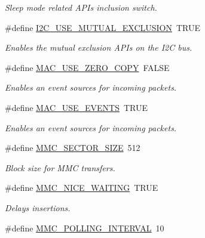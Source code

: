 \begin{DoxyCompactItemize}
\begin{DoxyCompactList}\small\item\em Sleep mode related A\+P\+Is inclusion switch. \end{DoxyCompactList}\item 
\hypertarget{group__HAL__CONF_ga7125642404a6fd3d4985d1cb6e1b7b0a}{}\#define \hyperlink{group__HAL__CONF_ga7125642404a6fd3d4985d1cb6e1b7b0a}{I2\+C\+\_\+\+U\+S\+E\+\_\+\+M\+U\+T\+U\+A\+L\+\_\+\+E\+X\+C\+L\+U\+S\+I\+O\+N}~T\+R\+U\+E\label{group__HAL__CONF_ga7125642404a6fd3d4985d1cb6e1b7b0a}

\begin{DoxyCompactList}\small\item\em Enables the mutual exclusion A\+P\+Is on the I2\+C bus. \end{DoxyCompactList}\item 
\hypertarget{group__HAL__CONF_gad763d9426413cf2fe3922ebb8578bc59}{}\#define \hyperlink{group__HAL__CONF_gad763d9426413cf2fe3922ebb8578bc59}{M\+A\+C\+\_\+\+U\+S\+E\+\_\+\+Z\+E\+R\+O\+\_\+\+C\+O\+P\+Y}~F\+A\+L\+S\+E\label{group__HAL__CONF_gad763d9426413cf2fe3922ebb8578bc59}

\begin{DoxyCompactList}\small\item\em Enables an event sources for incoming packets. \end{DoxyCompactList}\item 
\hypertarget{group__HAL__CONF_ga887da1c1383a9e7b45c4464877a7e05e}{}\#define \hyperlink{group__HAL__CONF_ga887da1c1383a9e7b45c4464877a7e05e}{M\+A\+C\+\_\+\+U\+S\+E\+\_\+\+E\+V\+E\+N\+T\+S}~T\+R\+U\+E\label{group__HAL__CONF_ga887da1c1383a9e7b45c4464877a7e05e}

\begin{DoxyCompactList}\small\item\em Enables an event sources for incoming packets. \end{DoxyCompactList}\item 
\hypertarget{group__HAL__CONF_ga502a0143be4c303f3006c0888e1cec82}{}\#define \hyperlink{group__HAL__CONF_ga502a0143be4c303f3006c0888e1cec82}{M\+M\+C\+\_\+\+S\+E\+C\+T\+O\+R\+\_\+\+S\+I\+Z\+E}~512\label{group__HAL__CONF_ga502a0143be4c303f3006c0888e1cec82}

\begin{DoxyCompactList}\small\item\em Block size for M\+M\+C transfers. \end{DoxyCompactList}\item 
\#define \hyperlink{group__HAL__CONF_ga3087dfffa81dd8a0a80ee92746e65fe2}{M\+M\+C\+\_\+\+N\+I\+C\+E\+\_\+\+W\+A\+I\+T\+I\+N\+G}~T\+R\+U\+E
\begin{DoxyCompactList}\small\item\em Delays insertions. \end{DoxyCompactList}\item 
\hypertarget{group__HAL__CONF_gac57e95210b57d6699c23bfb648e0904d}{}\#define \hyperlink{group__HAL__CONF_gac57e95210b57d6699c23bfb648e0904d}{M\+M\+C\+\_\+\+P\+O\+L\+L\+I\+N\+G\+\_\+\+I\+N\+T\+E\+R\+V\+A\+L}~10\label{group__HAL__CONF_gac57e95210b57d6699c23bfb648e0904d}


\end{DoxyCompactItemize}
